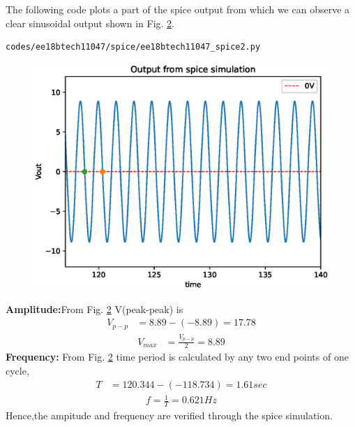 \begin{enumerate}[label=\arabic*.,ref=\theenumi]
\begin{figure}[!ht]
\caption{}
\label{fig:ee18btech11047_spice}
\end{figure}
%
The following code plots a part of the spice output from which we can observe a clear sinusoidal output shown in Fig. \ref{fig:ee18btech11047_spice2}.
\begin{lstlisting}
codes/ee18btech11047/spice/ee18btech11047_spice2.py
\end{lstlisting}
\begin{figure}[!ht]
\centering
\includegraphics[width=\columnwidth]{./figs/ee18btech11047/ee18btech11047_spice2.eps}
\caption{}
\label{fig:ee18btech11047_spice2}
\end{figure}
\renewcommand{\thefigure}{\theenumi}
%
\textbf{Amplitude:}From Fig. \ref{fig:ee18btech11047_spice2} V(peak-peak) is 
\begin{align}
V_{p-p} &= 8.89-(-8.89)= 17.78
\end{align}
\begin{align}
V_{max} &= \frac{V_{p-p}}{2} = 8.89
\end{align}
\textbf{Frequency:} From Fig. \ref{fig:ee18btech11047_spice2} time period is calculated by any two end points of one cycle,
\begin{align}
T&=120.344-(-118.734) = 1.61 sec
\end{align}
\begin{align}
f = \frac{1}{T} = 0.621 Hz
\end{align}
Hence,the ampitude and frequency are verified through the spice simulation.
\end{enumerate}
